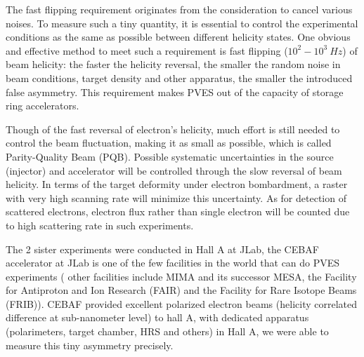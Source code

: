 The fast flipping requirement originates from the consideration to cancel various 
noises. To measure such a tiny quantity, it is essential to control
the experimental conditions as the same as possible between different
helicity states. One obvious and effective method to meet such a requirement is fast 
flipping ($10^2 - 10^3 \ Hz$) of beam helicity: the faster the helicity reversal, the smaller
the random noise in beam conditions, target density and other apparatus, the smaller
the introduced false asymmetry. This requirement makes PVES out of the capacity
of storage ring accelerators.

Though of the fast reversal of electron's helicity, much effort is still needed to
control the beam fluctuation, making it as small as possible, which is called
Parity-Quality Beam (PQB). Possible systematic uncertainties in the source (injector) 
and accelerator will be controlled through the slow reversal of beam helicity. 
In terms of the target deformity under electron bombardment,
a raster with very high scanning rate will minimize this uncertainty. As for 
detection of scattered electrons, electron flux rather than single electron will
be counted due to high scattering rate in such experiments.

The 2 sister experiments were conducted in Hall A at JLab, the CEBAF accelerator 
at JLab is one of the few facilities in the world that can do PVES experiments (
other facilities include MIMA and its successor MESA, the Facility for Antiproton
and Ion Research (FAIR) and the Facility for Rare Isotope Beams (FRIB)). CEBAF 
provided excellent polarized electron beams (helicity correlated difference at 
sub-nanometer level) to hall A, with dedicated apparatus 
(polarimeters, target chamber, HRS and others) in Hall A, we were able 
to measure this tiny asymmetry precisely.

